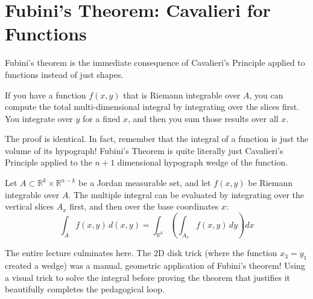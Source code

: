\section{Fubini's Theorem: Cavalieri for Functions}

\begin{spoken-clean}
Fubini's theorem is the immediate consequence of Cavalieri's Principle applied to functions instead of just shapes. 

If you have a function $f(x,y)$ that is Riemann integrable over $A$, you can compute the total multi-dimensional integral by integrating over the slices first. You integrate over $y$ for a fixed $x$, and then you sum those results over all $x$. 

The proof is identical. In fact, remember that the integral of a function is just the volume of its hypograph! Fubini's Theorem is quite literally just Cavalieri's Principle applied to the $n+1$ dimensional hypograph wedge of the function.
\end{spoken-clean}

\begin{orange-formula}
\begin{theorem}
Let $A \subset \mathbb{R}^k \times \mathbb{R}^{n-k}$ be a Jordan measurable set, and let $f(x,y)$ be Riemann integrable over $A$. The multiple integral can be evaluated by integrating over the vertical slices $A_x$ first, and then over the base coordinates $x$:
\[
\int_A f(x,y) \, d(x,y) = \int_{\mathbb{R}^k} \left( \int_{A_x} f(x,y) \, dy \right) dx
\]
\end{theorem}
\end{orange-formula}

\begin{didactic-insight}
The entire lecture culminates here. The 2D disk trick (where the function $x_3 = y_1$ created a wedge) was a manual, geometric application of Fubini's theorem! Using a visual trick to solve the integral before proving the theorem that justifies it beautifully completes the pedagogical loop.
\end{didactic-insight}
